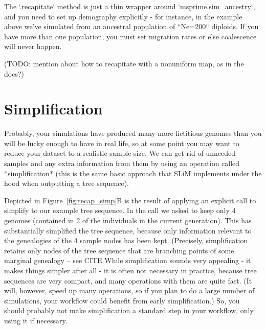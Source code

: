 \documentclass[12pt]{article}
\begin{document}
The `.recapitate` method
is just a thin wrapper around `msprime.sim\_ancestry`,
and you need to set up demography explicitly - for instance, in the example above
we've simulated from an ancestral population of ``Ne=200`` diploids.
If you have more than one population,
you must set migration rates or else coalescence will never happen.

(TODO: mention about how to recapitate with a nonuniform map, as in the docs?)


\section{Simplification}


Probably, your simulations have produced many more fictitious genomes
than you will be lucky enough to have in real life,
so at some point you may want to reduce your dataset to a realistic sample size.
We can get rid of unneeded samples and any extra information from them by using
an operation called *simplification* (this is the same basic approach that SLiM
implements under the hood when outputting a tree sequence).

Depicted in Figure~\ref{fig:recap_simp}B is the result of applying an explicit call to
simplify to our example tree sequence.
In the call we asked to keep only 4
genomes (contained in 2 of the individuals in the current generation). This has
substantially simplified the tree sequence, because only information relevant to the
genealogies of the 4 sample nodes has been kept. (Precisely, simplification retains only
nodes of the tree sequence that are branching points of some marginal genealogy -- see
CITE %
While simplification sounds very appealing - it makes things simpler after all -
it is often not necessary in practice, because tree sequences are very compact,
and many operations with them are quite fast.
(It will, however, speed up many operations, so if you plan to do a large number of simulations,
your workflow could benefit from early simplification.)
So, you should probably not make simplification a standard step in your workflow,
only using it if necessary.
\end{document}
